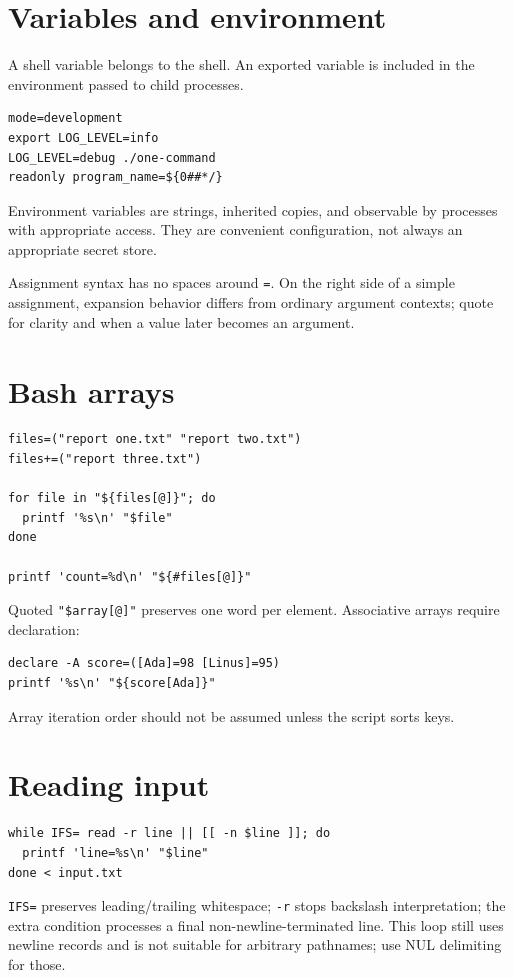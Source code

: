 \documentclass[11pt,oneside,openany]{book}
\begin{document}
\section{Variables and environment}
A shell variable belongs to the shell. An exported variable is included in the environment passed to child processes.
\begin{lstlisting}
mode=development
export LOG_LEVEL=info
LOG_LEVEL=debug ./one-command
readonly program_name=${0##*/}
\end{lstlisting}
Environment variables are strings, inherited copies, and observable by processes with appropriate access. They are convenient configuration, not always an appropriate secret store.

Assignment syntax has no spaces around \texttt{=}. On the right side of a simple assignment, expansion behavior differs from ordinary argument contexts; quote for clarity and when a value later becomes an argument.

\section{Bash arrays}
\begin{lstlisting}
files=("report one.txt" "report two.txt")
files+=("report three.txt")

for file in "${files[@]}"; do
  printf '%s\n' "$file"
done

printf 'count=%d\n' "${#files[@]}"
\end{lstlisting}
Quoted \texttt{"\${array[@]}"} preserves one word per element. Associative arrays require declaration:
\begin{lstlisting}
declare -A score=([Ada]=98 [Linus]=95)
printf '%s\n' "${score[Ada]}"
\end{lstlisting}
Array iteration order should not be assumed unless the script sorts keys.

\section{Reading input}
\begin{lstlisting}
while IFS= read -r line || [[ -n $line ]]; do
  printf 'line=%s\n' "$line"
done < input.txt
\end{lstlisting}
\texttt{IFS=} preserves leading/trailing whitespace; \texttt{-r} stops backslash interpretation; the extra condition processes a final non-newline-terminated line. This loop still uses newline records and is not suitable for arbitrary pathnames; use NUL delimiting for those.
\end{document}
